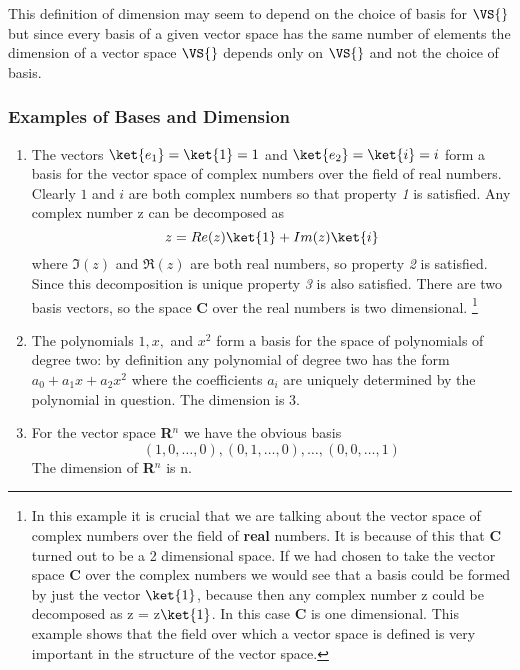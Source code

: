This definition of dimension may seem to depend on the choice of basis for $\VS{}$ but since every basis of a given vector space has the same number of elements the dimension of a vector space $\VS{}$ depends only on $\VS{}$ and not the choice of basis.

\subsubsection{Examples of Bases and Dimension}
\begin{enumerate}
\item The vectors $\ket{e_1} = \ket{1} = 1$ and $\ket{e_2} = \ket{i} = i$ form a basis for the vector space of complex numbers over the field of real numbers.
Clearly $1$ and $i$ are both complex numbers so that property \textit{1} is satisfied.
Any complex number z can be decomposed as
\begin{displaymath}
z = Re(z) \ket{1} + Im(z) \ket{i}
\end{displaymath}
where $\Im(z)$ and $\Re(z)$ are both real numbers, so property \textit{2} is satisfied.
Since this decomposition is unique property \textit{3} is also satisfied.
There are two basis vectors, so the space \textbf{C} over the real numbers is two dimensional. \footnote{In this example it is crucial that we are talking about the vector space of complex numbers over the field of \textbf{real} numbers.  It is because of this that \textbf{C} turned out to be a 2 dimensional space.  If we had chosen to take the vector space \textbf{C} over the complex numbers we would see that a basis could be formed by just the vector $\ket{1}$, because then any complex number z could be decomposed as z = z$\ket{1}$.  In this case \textbf{C} is one dimensional.  This example shows that the field over which a vector space is defined is very important in the structure of the vector space.}
\item The polynomials $1, x,$ and $x^{2}$ form a basis for the space of polynomials of degree two: by definition any polynomial of degree two has the form $a_0 + a_{1}x + a_{2}x^{2}$ where the coefficients $a_i$ are uniquely determined by the polynomial in question.
The dimension is 3.
\item For the vector space \textbf{R}$^{n}$ we have the obvious basis
\begin{displaymath}
(1,0,\ldots ,0), (0,1,\ldots ,0), \ldots , (0,0,\ldots ,1)
\end{displaymath}
The dimension of \textbf{R}$^{n}$ is n.
\end{enumerate}

